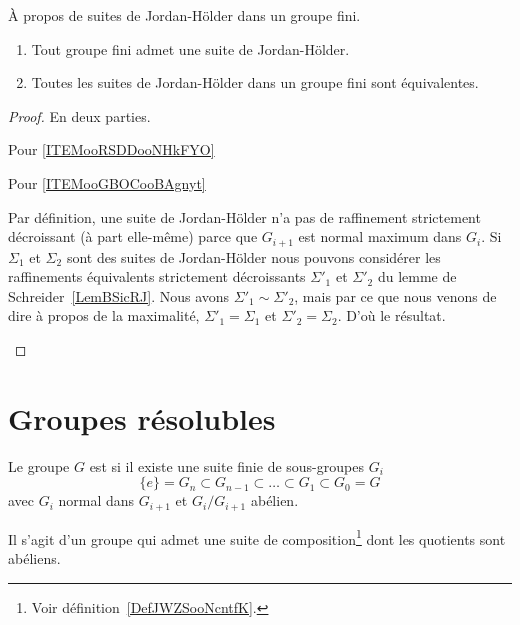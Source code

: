 \begin{theorem}\label{ThoLgxWIC}
	À propos de suites de Jordan-Hölder dans un groupe fini.
	\begin{enumerate}
		\item       \label{ITEMooRSDDooNHkFYO}
			Tout groupe fini admet une suite de Jordan-Hölder.
		\item       \label{ITEMooGBOCooBAgnyt}
			Toutes les suites de Jordan-Hölder dans un groupe fini sont équivalentes.
	\end{enumerate}
\end{theorem}

\begin{proof}
	En deux parties.
	\begin{subproof}
	\item[Pour \ref{ITEMooRSDDooNHkFYO}]
	\item[Pour \ref{ITEMooGBOCooBAgnyt}]

	Par définition, une suite de Jordan-Hölder n'a pas de raffinement strictement décroissant (à part elle-même) parce que \( G_{i+1}\) est normal maximum dans \( G_i\). Si \( \Sigma_1\) et \( \Sigma_2\) sont des suites de Jordan-Hölder nous pouvons considérer les raffinements équivalents strictement décroissants \( \Sigma'_1\) et \( \Sigma'_2\) du lemme de Schreider~\ref{LemBSicRJ}. Nous avons \( \Sigma'_1\sim\Sigma'_2\), mais par ce que nous venons de dire à propos de la maximalité, \( \Sigma'_1=\Sigma_1\) et \( \Sigma'_2=\Sigma_2\). D'où le résultat.
    \end{subproof}
\end{proof}

\section{Groupes résolubles}

\begin{definition}  \label{DefOSYNooTROIKs}
	Le groupe \( G\) est  si il existe une suite finie de sous-groupes \( G_i\)
	\begin{equation}
		\{ e \}=G_n\subset G_{n-1}\subset\ldots\subset G_1\subset G_0=G
	\end{equation}
	avec \( G_i\) normal dans \( G_{i+1}\) et \( G_i/G_{i+1}\) abélien.
\end{definition}
Il s'agit d'un groupe qui admet une suite de composition\footnote{Voir définition~\ref{DefJWZSooNcntfK}.} dont les quotients sont abéliens.

